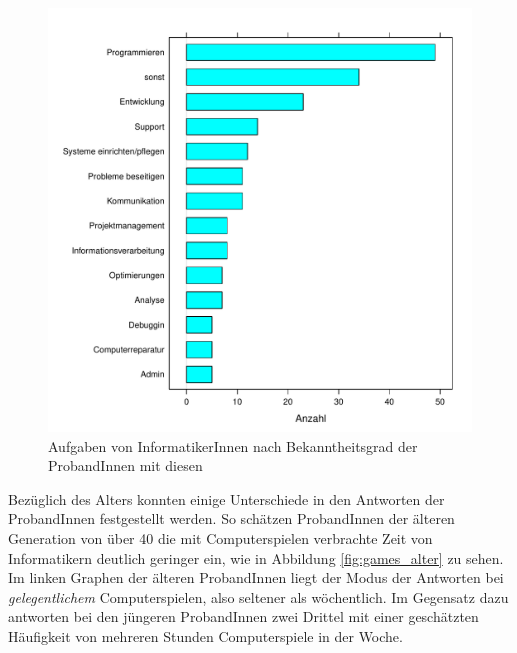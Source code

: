 \documentclass[de]{agse-empir-report}\usepackage[]{graphicx}\usepackage[]{color}
\newenvironment{knitrout}{}{} %
\begin{document}
\begin{figure}
\begin{knitrout}
\color{fgcolor}
\includegraphics[width=\linewidth]{figure/chart_jobs-1} 

\end{knitrout}
    \caption{Aufgaben von InformatikerInnen nach Bekanntheitsgrad der ProbandInnen mit diesen}
    \label{fig:jobs}
\end{figure}

Bez\"uglich des Alters konnten einige Unterschiede in den Antworten der ProbandInnen festgestellt werden. So sch\"atzen ProbandInnen der \"alteren Generation von \"uber 40 die mit Computerspielen verbrachte Zeit von Informatikern deutlich geringer ein, wie in Abbildung \ref{fig:games_alter} zu sehen. Im linken Graphen der \"alteren ProbandInnen liegt der Modus der Antworten bei \emph{gelegentlichem} Computerspielen, also seltener als w\"ochentlich. Im Gegensatz dazu antworten bei den j\"ungeren ProbandInnen zwei Drittel mit einer gesch\"atzten H\"aufigkeit von mehreren Stunden Computerspiele in der Woche.  
\end{document}
